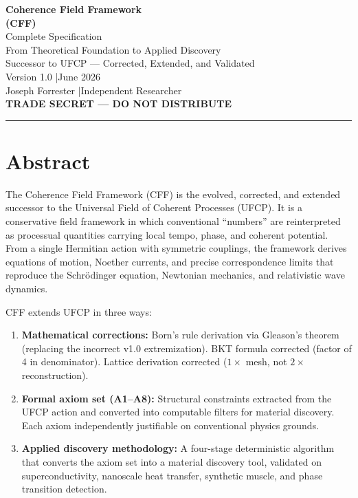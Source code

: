 \documentclass[11pt, a4paper]{article}
\begin{document}
\begin{center}
  {\LARGE \textbf{Coherence Field Framework}}\\[4pt]
  {\LARGE \textbf{(CFF)}}\\[8pt]
  {\large Complete Specification}\\[4pt]
  {\large From Theoretical Foundation to Applied Discovery}\\[4pt]
  {\large Successor to UFCP --- Corrected, Extended, and Validated}\\[12pt]
  {\color{nm-gray}\small Version 1.0 \quad|\quad June 2026}\\[4pt]
  {\color{nm-gray}\small Joseph Forrester \quad|\quad Independent Researcher}\\[4pt]
  \textcolor{nm-red}{\textbf{TRADE SECRET --- DO NOT DISTRIBUTE}}
\end{center}

\vspace{1em}
\hrule
\vspace{1em}

\section*{Abstract}

The Coherence Field Framework (CFF) is the evolved, corrected, and
extended successor to the Universal Field of Coherent Processes (UFCP).
It is a conservative field framework in which conventional ``numbers''
are reinterpreted as processual quantities carrying local tempo, phase,
and coherent potential. From a single Hermitian action with symmetric
couplings, the framework derives equations of motion, Noether currents,
and precise correspondence limits that reproduce the Schr\"odinger
equation, Newtonian mechanics, and relativistic wave dynamics.

CFF extends UFCP in three ways:
\begin{enumerate}[nosep]
  \item \textbf{Mathematical corrections:} Born's rule derivation via
    Gleason's theorem (replacing the incorrect v1.0 extremization).
    BKT formula corrected (factor of 4 in denominator). Lattice
    derivation corrected ($1\times$ mesh, not $2\times$ reconstruction).
  \item \textbf{Formal axiom set (A1--A8):} Structural constraints
    extracted from the UFCP action and converted into computable
    filters for material discovery. Each axiom independently
    justifiable on conventional physics grounds.
  \item \textbf{Applied discovery methodology:} A four-stage
    deterministic algorithm that converts the axiom set into a
    material discovery tool, validated on superconductivity,
    nanoscale heat transfer, synthetic muscle, and phase transition
    detection.
\end{enumerate}
\end{document}

